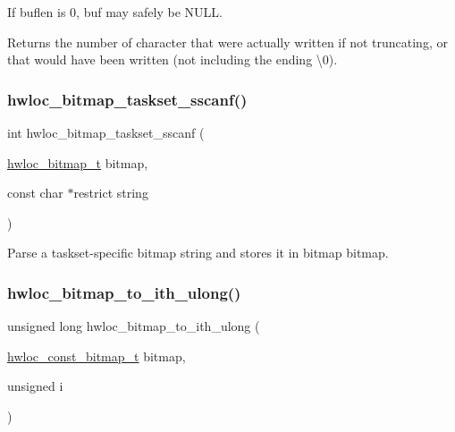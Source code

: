 If {\ttfamily buflen} is 0, {\ttfamily buf} may safely be {\ttfamily N\+U\+LL}.

\begin{DoxyReturn}{Returns}
the number of character that were actually written if not truncating, or that would have been written (not including the ending \textbackslash{}0). 
\end{DoxyReturn}
\mbox{\label{a00205_ga4f23db5041240e03e348752f8bd6ec2d}} 
\subsubsection{\texorpdfstring{hwloc\+\_\+bitmap\+\_\+taskset\+\_\+sscanf()}{hwloc\_bitmap\_taskset\_sscanf()}}
{\footnotesize\ttfamily int hwloc\+\_\+bitmap\+\_\+taskset\+\_\+sscanf (\begin{DoxyParamCaption}\item[{\hyperlink{a00205_gaa3c2bf4c776d603dcebbb61b0c923d84}{hwloc\+\_\+bitmap\+\_\+t}}]{bitmap,  }\item[{const char $\ast$restrict}]{string }\end{DoxyParamCaption})}



Parse a taskset-\/specific bitmap string and stores it in bitmap {\ttfamily bitmap}. 

\mbox{\label{a00205_gac92e6404f648d6b99d2c626b05b2ffa4}} 
\subsubsection{\texorpdfstring{hwloc\+\_\+bitmap\+\_\+to\+\_\+ith\+\_\+ulong()}{hwloc\_bitmap\_to\_ith\_ulong()}}
{\footnotesize\ttfamily unsigned long hwloc\+\_\+bitmap\+\_\+to\+\_\+ith\+\_\+ulong (\begin{DoxyParamCaption}\item[{\hyperlink{a00205_gae991a108af01d408be2776c5b2c467b2}{hwloc\+\_\+const\+\_\+bitmap\+\_\+t}}]{bitmap,  }\item[{unsigned}]{i }\end{DoxyParamCaption})}



